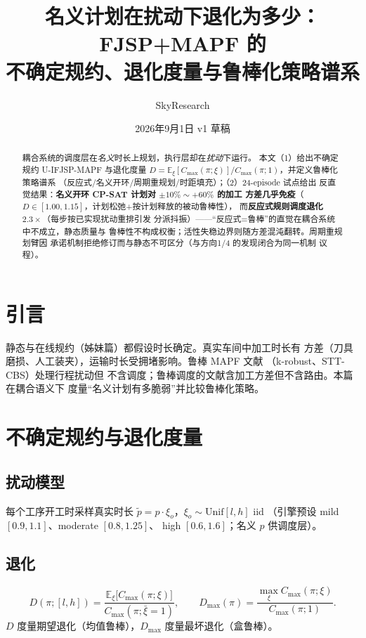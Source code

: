 \documentclass[UTF8,12pt,a4paper]{ctexart}
\title{名义计划在扰动下退化为多少：FJSP+MAPF 的\\不确定规约、退化度量与鲁棒化策略谱系}
\author{SkyResearch}
\date{2026年9月1日 \quad v1 草稿}
\newcommand{\Cmax}{C_{\max}}
\begin{document}
\maketitle

\begin{abstract}
耦合系统的调度层在\emph{名义}时长上规划，执行层却在\emph{扰动}下运行。
本文（1）给出不确定规约 U-IFJSP-MAPF 与退化度量
$D=\mathbb{E}_\xi[\Cmax(\pi;\xi)]/\Cmax(\pi;1)$，并定义鲁棒化策略谱系
（反应式/名义开环/周期重规划/时距填充）；（2）24-episode 试点给出
反直觉结果：\textbf{名义开环 CP-SAT 计划对 $\pm10\%\sim+60\%$ 的加工
方差几乎免疫}（$D\in[1.00,1.15]$，计划松弛+按计划释放的被动鲁棒性），
而\textbf{反应式规则调度退化 $2.3\times$}（每步按已实现扰动重排引发
分派抖振）——``反应式=鲁棒''的直觉在耦合系统中不成立，静态质量与
鲁棒性不构成权衡；活性失稳边界则随方差混沌翻转。周期重规划臂因
承诺机制拒绝修订而与静态不可区分（与方向1/4 的发现闭合为同一机制
议程）。
\end{abstract}

\section{引言}

静态与在线规约（姊妹篇）都假设时长确定。真实车间中加工时长有
方差（刀具磨损、人工装夹），运输时长受拥堵影响。鲁棒 MAPF 文献
（k-robust、STT-CBS\cite{vanderwedden2020sttcbs}）处理行程扰动但
不含调度；鲁棒调度的文献含加工方差但不含路由。本篇在耦合语义下
度量``名义计划有多脆弱''并比较鲁棒化策略。

\section{不确定规约与退化度量}\label{sec:form}

\subsection{扰动模型}
每个工序开工时采样真实时长
$\tilde p = p\cdot\xi_o$，$\xi_o\sim\mathrm{Unif}[l,h]$ iid
（引擎预设 mild $[0.9,1.1]$、moderate $[0.8,1.25]$、
high $[0.6,1.6]$；名义 $p$ 供调度层）。

\subsection{退化}
\begin{equation}
D(\pi;[l,h]) = \frac{\mathbb{E}_{\xi}\bigl[\Cmax(\pi;\xi)\bigr]}
{\Cmax(\pi; \bar\xi{=}1)},\qquad
D_{\max}(\pi) = \frac{\max_\xi \Cmax(\pi;\xi)}{\Cmax(\pi;1)}.
\end{equation}
$D$ 度量期望退化（均值鲁棒），$D_{\max}$ 度量最坏退化（盒鲁棒）。
\end{document}
